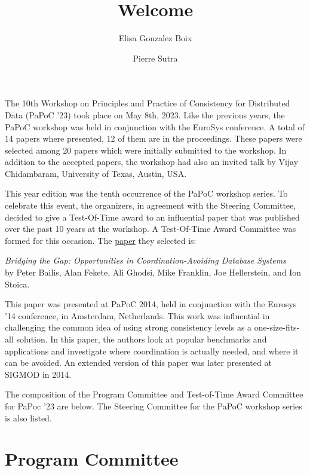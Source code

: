 \documentclass[acmlarge,nonacm]{acmart}
\newenvironment{RCText}[1][2em]
               {\begin{quoting}[leftmargin=#1,rightmargin=.5cm]\RaggedRight}
               {\end{quoting}}
\begin{document}
\title{Welcome}
\author{Elisa Gonzalez Boix}
\author{Pierre Sutra}
\authorsaddresses{}
\renewcommand{\shortauthors}{}
\maketitle

The 10th Workshop on Principles and Practice of Consistency for Distributed Data (PaPoC '23) took place on May 8th, 2023.
Like the previous years, the PaPoC workshop was held in conjunction with the EuroSys conference.
A total of 14 papers where presented, 12 of them are in the proceedings.
These papers were selected among 20 papers which were initially submitted to the workshop.
In addition to the accepted papers, the workshop had also an invited talk by Vijay Chidambaram, University of Texas, Austin, USA.

This year edition was the tenth occurrence of the PaPoC workshop series.
To celebrate this event, the organizers, in agreement with the Steering Committee, decided to give a Test-Of-Time award to an influential paper that was published over the past 10 years at the workshop.
A Test-Of-Time Award Committee was formed for this occasion.
The \href{http://www.bailis.org/blog/bridging-the-gap-opportunities-in-coordination-avoiding-databases/}{paper} they selected is:

\medskip

\begin{RCText}[2cm]
  \textit{Bridging the Gap: Opportunities in Coordination-Avoiding Database Systems} \\
  by Peter Bailis, Alan Fekete, Ali Ghodsi, Mike Franklin, Joe Hellerstein, and Ion Stoica.
\end{RCText}

\medskip

This paper was presented at PaPoC 2014, held in conjunction with the Eurosys '14 conference, in Amsterdam, Netherlands.
This work was influential in challenging the common idea of using strong consistency levels as a one-size-fits-all solution.
In this paper, the authors look at popular benchmarks and applications and investigate where coordination is actually needed, and where it can be avoided.
An extended version of this paper was later presented at SIGMOD in 2014.

The composition of the Program Committee and Test-of-Time Award Committee for PaPoc '23 are below.
The Steering Committee for the PaPoC workshop series is also listed.

\section*{Program Committee}
\end{document}
